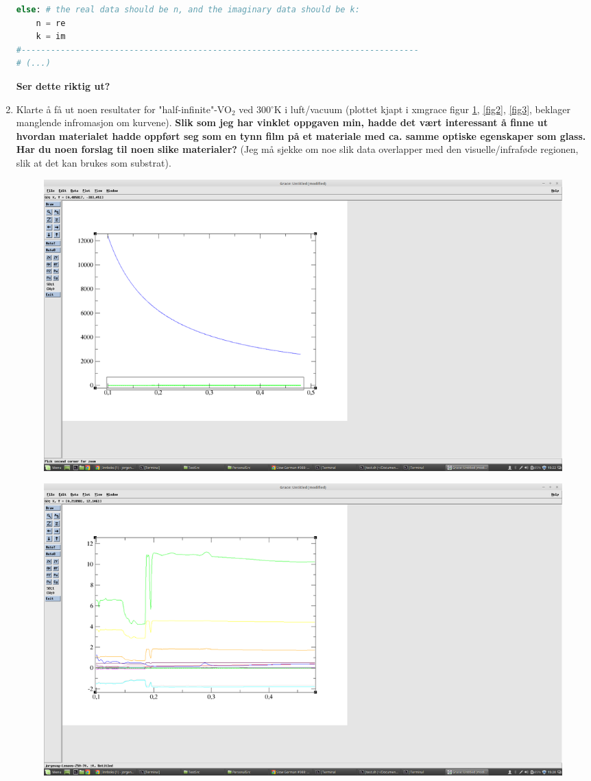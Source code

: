 \begin{enumerate}[label=\textbf{\arabic*})]
\begin{lstlisting}[style=FormattedNumber, language=python]
else: # the real data should be n, and the imaginary data should be k:
    n = re
    k = im
#---------------------------------------------------------------------------------
# (...)
     \end{lstlisting}
      \textbf{Ser dette riktig ut?} 


   \item 
      Klarte å få ut noen resultater for "half-infinite"-VO$_2$ ved 300$^{\circ}$K i luft/vacuum
      (plottet kjapt i xmgrace figur \ref{fig1}, \ref{fig2}, \ref{fig3}, beklager manglende infromasjon om
      kurvene). 
      \textbf{Slik som jeg har vinklet oppgaven
      min, hadde det vært interessant å finne ut hvordan materialet hadde oppført seg som 
      en tynn film på et materiale med ca. samme optiske egenskaper som glass. Har du noen
   forslag til noen slike materialer?} (Jeg må sjekke om noe slik data overlapper med den 
   visuelle/infraføde regionen, slik at det kan brukes som substrat).
      \begin{figure}[h!] 
      \centering 
      \includegraphics[width=1.0\textwidth]{Figures/result1a.png} 
      \caption{}
      \label{fig1}
      \end{figure}
      \begin{figure}[h!] 
      \centering 
      \includegraphics[width=1.0\textwidth]{Figures/result1b.png} 

\end{figure}
\end{enumerate}
